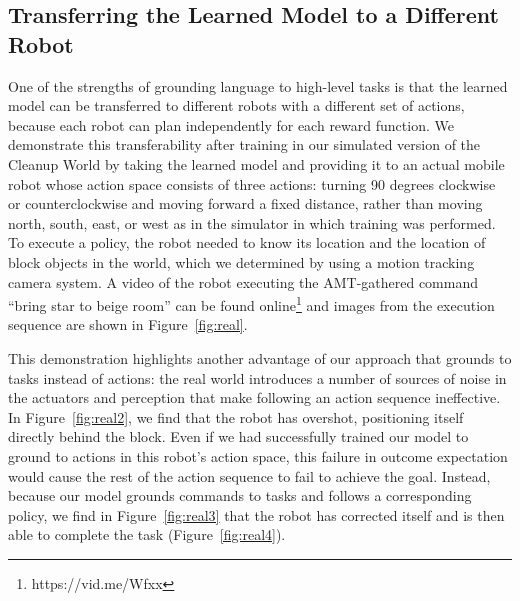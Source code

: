 \documentclass[conference]{IEEEtran}
\begin{document}
\subsection{Transferring the Learned Model to a Different Robot}
One of the strengths of grounding language to high-level tasks is that the learned model can be transferred to different robots with a different set of actions, because each robot can plan independently for each reward function. We demonstrate this transferability after training in our simulated version of the Cleanup World by taking the learned model and providing it to an actual mobile robot whose action space consists of three actions: turning 90 degrees clockwise or counterclockwise and moving forward a fixed distance, rather than moving north, south, east, or west as in the simulator in which training was performed. To execute a policy, the robot needed to know its location and the location of block objects in the world, which we determined by using a motion tracking camera system. A video of the robot executing the AMT-gathered command ``bring star to beige room'' can be found online\footnote{https://vid.me/Wfxx} and images from the execution sequence are shown in Figure~\ref{fig:real}.

This demonstration highlights another advantage of our approach that grounds to tasks instead of actions: the real world introduces a number of sources of noise in the actuators and perception that make following an action sequence ineffective. In Figure~\ref{fig:real2}, we find that the robot has overshot, positioning itself directly behind the block. Even if we had successfully trained our model to ground to actions in this robot's action space, this failure in outcome expectation would cause the rest of the action sequence to fail to achieve the goal. Instead, because our model grounds commands to tasks and follows a corresponding policy, we find in Figure~\ref{fig:real3} that the robot has corrected itself and is then able to complete the task (Figure~\ref{fig:real4}).
\end{document}
